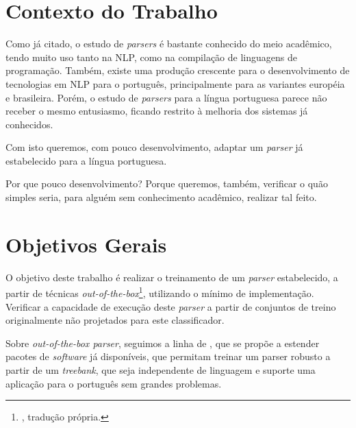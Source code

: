     
\section{Contexto do Trabalho}
\label{sec:contexto}
Como já citado, o estudo de \textit{parsers} é bastante conhecido do meio acadêmico, tendo muito uso tanto na NLP, como na compilação de linguagens de programação. Também, existe uma produção crescente para o desenvolvimento de tecnologias em NLP para o português, principalmente para as variantes européia e brasileira. Porém, o estudo de \textit{parsers} para a língua portuguesa parece não receber o mesmo entusiasmo, ficando restrito à melhoria dos sistemas já conhecidos.

Com isto queremos, com pouco desenvolvimento, adaptar um \textit{parser} já estabelecido para a língua portuguesa. 

Por que pouco desenvolvimento? Porque queremos, também, verificar o quão simples seria, para alguém sem conhecimento acadêmico, realizar tal feito.


\section{Objetivos Gerais}
\label{sec:objetivos-gerais}

O objetivo deste trabalho é realizar o treinamento de um \textit{parser} estabelecido, a partir de técnicas \textit{out-of-the-box}\footnote{, tradução própria.}, utilizando o mínimo de implementação. Verificar a capacidade de execução deste \textit{parser} a partir de conjuntos de treino originalmente não projetados para este classificador.

Sobre \textit{out-of-the-box parser}, seguimos a linha de , que se propõe a estender pacotes de \textit{software} já disponíveis, que permitam treinar um parser robusto a partir de um \textit{treebank}, que seja independente de linguagem e suporte uma aplicação para o português sem grandes problemas.

